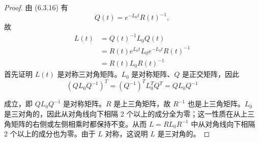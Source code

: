 \begin{proof}
由 (6.3.16) 有
\begin{equation}
  Q(t)=e^{-L_0t}R(t)^{-1},
  \tag{6.3.18}
\end{equation}
故
\begin{equation}
  \begin{aligned}
    L(t)&=Q(t)^{-1}L_0Q(t)\\
    &=R(t)e^{L_0t}L_0e^{-L_0t}R(t)^{-1}\\
    &=R(t)L_0R(t)^{-1}
  \end{aligned}
  \tag{6.3.19}
\end{equation}
首先证明 $L(t)$ 是对称三对角矩阵。$L_0$ 是对称矩阵、$Q$ 是正交矩阵，因此
\begin{equation}
  (QL_0Q^{-1})^T=(Q^{-1})^T L_0^TQ^T=QL_0Q^{-1}
  \tag{6.3.20}
\end{equation}

成立，即 $QL_0Q^{-1}$ 是对称矩阵。$R$ 是上三角矩阵，故 $R^{-1}$ 也是上三角矩阵。$L_0$ 是三对角的，因此从对角线向下相隔 2 个以上的成分全为零；这一性质在从上三角矩阵的右侧或左侧相乘时都保持不变。从而 $L=RL_0R^{-1}$ 中从对角线向下相隔 2 个以上的成分也为零。由于 $L$ 对称，这说明 $L$ 是三对角的。


\end{proof}

